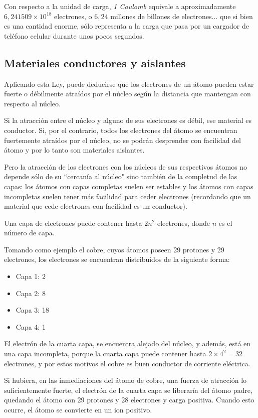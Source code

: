 Con respecto a la unidad de carga, \textit{1 Coulomb} equivale a aproximadamente $6,241509\times 10^{18}$ electrones, o $6,24$ millones de billones de electrones... que si bien es una cantidad enorme, sólo representa a la carga que pasa por un cargador de teléfono celular durante unos pocos segundos.

\subsection{Materiales conductores y aislantes}

Aplicando esta Ley, puede deducirse que los electrones de un átomo pueden estar fuerte o débilmente atraídos por el núcleo según la distancia que mantengan con respecto al núcleo.

Si la atracción entre el núcleo y alguno de sus electrones es débil, ese material es conductor. Si, por el contrario, todos los electrones del átomo se encuentran fuertemente atraídos por el núcleo, no se podrán desprender con facilidad del átomo y por lo tanto son materiales aislantes.

Pero la atracción de los electrones con los núcleos de sus respectivos átomos no depende sólo de su ``cercanía al núcleo" sino también de la completud de las capas: los átomos con capas completas suelen ser estables y los átomos con capas incompletas suelen tener más facilidad para ceder electrones (recordando que un material que cede electrones con facilidad es un conductor).

Una capa de electrones puede contener hasta $2n^{2}$ electrones, donde $n$ es el número de capa.

Tomando como ejemplo el cobre, cuyos átomos poseen 29 protones y 29 electrones, los electrones se encuentran distribuidos de la siguiente forma:
\begin{itemize}
	\item Capa 1: 2
	\item Capa 2: 8
	\item Capa 3: 18
	\item Capa 4: 1
\end{itemize}

El electrón de la cuarta capa, se encuentra alejado del núcleo, y además, está en una capa incompleta, porque la cuarta capa puede contener hasta $2\times 4^{2}=32$ electrones, y por estos motivos el cobre es buen conductor de corriente eléctrica.

Si hubiera, en las inmediaciones del átomo de cobre, una fuerza de atracción lo suficientemente fuerte, el electrón de la cuarta capa se liberaría del átomo padre, quedando el átomo con 29 protones y 28 electrones y carga positiva. Cuando esto ocurre, el átomo se convierte en un ion positivo.

